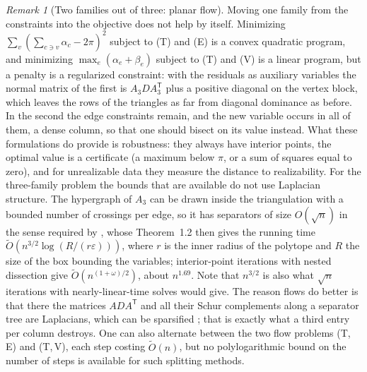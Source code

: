 \documentclass[11pt]{amsart}
\theoremstyle{definition}
\theoremstyle{remark}
\newtheorem{remark}[theorem]{Remark}
\newcommand{\Ot}{\widetilde{O}}
\newcommand{\eps}{\varepsilon}
\begin{document}
\begin{remark}[Two families out of three: planar flow]
Moving one family from the constraints into the objective does not help by itself. Minimizing $\sum_v(\sum_{c\ni v}\alpha_c-2\pi)^2$ subject to \textup{(T)} and \textup{(E)} is a convex quadratic program, and minimizing $\max_e(\alpha_e+\beta_e)$ subject to \textup{(T)} and \textup{(V)} is a linear program, but a penalty is a regularized constraint: with the residuals as auxiliary
variables the normal matrix of the first is $A_3DA_3^{\mathsf T}$ plus a positive diagonal on the vertex block, which leaves the rows of the triangles as far from diagonal dominance as before. In the second the edge constraints remain, and the new variable occurs in all of them, a dense column, so that one should bisect on its value instead.
What these formulations do provide is robustness: they always have interior points, the optimal value is a certificate (a maximum below $\pi$, or a sum of squares equal to zero), and for unrealizable data they measure the distance to realizability.
For the three-family problem the bounds that are available do not use Laplacian structure. The hypergraph of $A_3$ can be drawn inside the triangulation with a bounded number of crossings per edge, so it has separators of size $O(\sqrt n)$ in the sense required by \cite{DGLSY24}, whose Theorem~1.2 then gives the running time
$\Ot(n^{3/2}\log(R/(r\eps)))$, where $r$ is the inner radius of the polytope and $R$ the size of the box bounding the variables; interior-point iterations with nested dissection give $\Ot(n^{(1+\omega)/2})$, about $n^{1.69}$. Note that $n^{3/2}$ is also what $\sqrt n$ iterations with nearly-linear-time solves would give.
The reason flows do better is that there the matrices $ADA^{\mathsf T}$ and all their Schur complements along a separator tree are Laplacians, which can be sparsified \cite{DGGLPSY22}; that is exactly what a third entry per column destroys.
One can also alternate between the two flow problems \textup{(T,\,E)} and \textup{(T,\,V)}, each step costing $\Ot(n)$, but no polylogarithmic bound on the number of steps is available for such splitting methods.
\end{remark}
\end{document}
